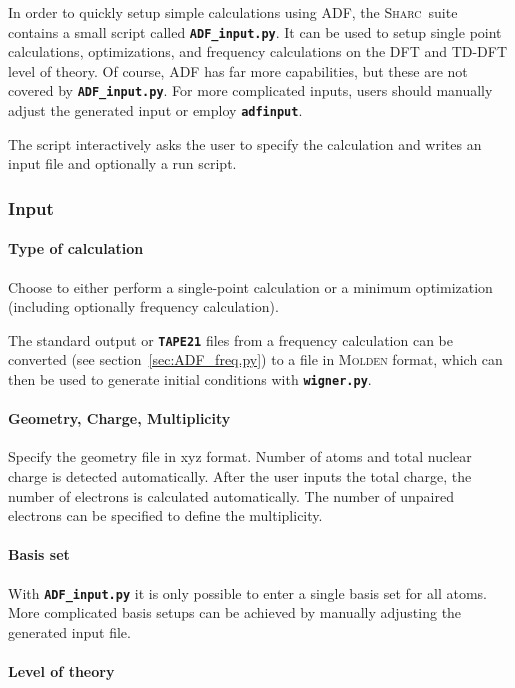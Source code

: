 \documentclass[a4paper,10pt,DIV=15,openany]{scrbook}
\newcommand{\sharc}{\textsc{Sharc}}
\newcommand{\ttt}[1]{\textbf{\texttt{#1}}}
\begin{document}
In order to quickly setup simple calculations using ADF, the \sharc\ suite contains a small script called \ttt{ADF\_input.py}. It can be used to setup single point calculations, optimizations, and frequency calculations on the DFT and TD-DFT level of theory. Of course, ADF has far more capabilities, but these are not covered by \ttt{ADF\_input.py}. For more complicated inputs, users should manually adjust the generated input or employ \ttt{adfinput}.

The script interactively asks the user to specify the calculation and writes an input file and optionally a run script.

\subsubsection{Input}

\paragraph{Type of calculation}

Choose to either perform a single-point calculation or a minimum optimization (including optionally frequency calculation).

The standard output or \ttt{TAPE21} files from a frequency calculation can be converted (see section~\ref{sec:ADF_freq.py}) to a file in \textsc{Molden} format, which can then be used to generate initial conditions with \ttt{wigner.py}.

\paragraph{Geometry, Charge, Multiplicity}

Specify the geometry file in xyz format. Number of atoms and total nuclear charge is detected automatically. After the user inputs the total charge, the number of electrons is calculated automatically. The number of unpaired electrons can be specified to define the multiplicity.

\paragraph{Basis set}

With \ttt{ADF\_input.py} it is only possible to enter a single basis set for all atoms. More complicated basis setups can be achieved by manually adjusting the generated input file.

\paragraph{Level of theory}
\end{document}
